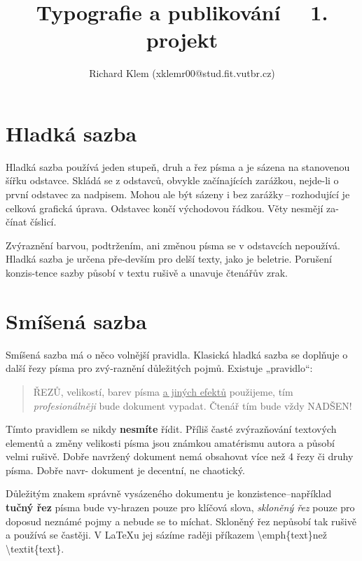 \documentclass[10pt,twocolumn]{article}
\title{Typografie a publikování ~~1. projekt}
\author{Richard Klem (xklemr00@stud.fit.vutbr.cz)}
\date{}
\begin{document}
\maketitle

\section{Hladká sazba}
\noindent Hladká sazba používá jeden stupeň, druh a řez písma\break
a je sázena na stanovenou šířku odstavce. Skládá\break
se z odstavců, obvykle začínajících zarážkou, nejde-li\break
o první odstavec za nadpisem. Mohou ale být sázeny\break
i bez zarážky\,–\,rozhodující je celková grafická úprava.\break
Odstavec končí východovou řádkou. Věty nesmějí za-čínat číslicí.


Zvýraznění barvou, podtržením, ani změnou písma\break
se v odstavcích nepoužívá. Hladká sazba je určena pře-devším
pro delší texty, jako je beletrie. Porušení konzis-tence
sazby působí v textu rušivě a unavuje čtenářův\break
zrak.
\section{Smíšená sazba}
\noindent Smíšená sazba má o něco volnější pravidla. Klasická\break
hladká sazba se doplňuje o další řezy písma pro zvý-\break raznění
důležitých pojmů. Existuje „pravidlo“:
\begin{quotation}
{{} {\scriptsize{\MakeUppercase{řezů}}}, {\tiny{velikostí}}, barev
písma \underline{a jiných efektů} použijeme, tím \textit{{\large{profesionálněji}}}
bude dokument vypadat. Čtenář
tím bude vždy {\scriptsize{\MakeUppercase{nadšen!}}}}    
\end{quotation}


{\footnotesize{Tímto}} pravidlem se nikdy \textbf{nesmíte} řídit. Příliš časté
{\large{zvýrazňování}} textových elementů a změny velikosti
{\fontsize{20}{0}\selectfont písma} jsou známkou amatérismu autora a působí
{\fontsize{24}{0}\selectfont velmi} rušivě. Dobře navržený dokument nemá
obsahovat více než 4 řezy či druhy písma. Dobře navr-
dokument je decentní, ne chaotický.


Důležitým znakem správně vysázeného dokumentu
je konzistence–například \textbf{tučný řez} písma bude vy-\break hrazen
pouze pro klíčová slova, \textit{skloněný řez} pouze\break
pro doposud neznámé pojmy a nebude se to míchat.\break
Skloněný řez nepůsobí tak rušivě a používá se častěji.\break
V \LaTeX u jej sázíme raději příkazem {\selectfont \textbackslash{}emph\{text\}}než\break
{\selectfont \textbackslash textit\{text\}}.
\end{document}

